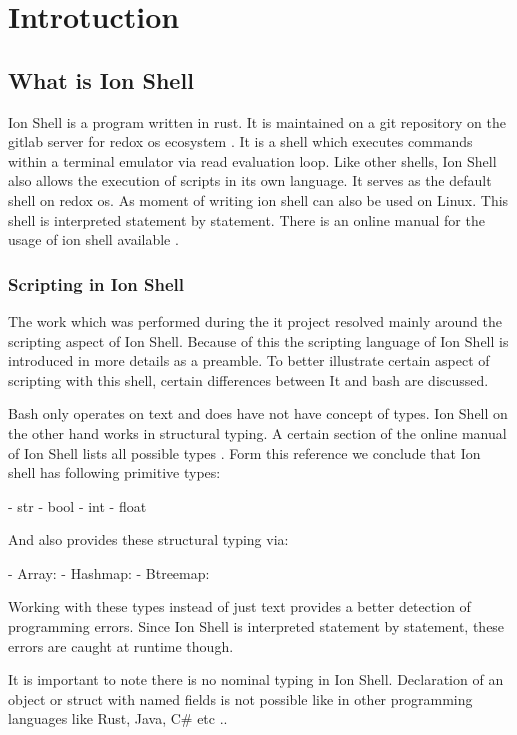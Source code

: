 \chapter{Introtuction}\label{ch:intro}

\section{What is Ion Shell}

Ion Shell is a program written in rust.
It is maintained on a git repository on the gitlab server for redox os ecosystem \cite{ion_shell}.
It is a shell which executes commands within a terminal emulator via read evaluation loop.
Like other shells, Ion Shell also allows the execution of scripts in its own language.
It serves as the default shell on redox os.
As moment of writing ion shell can also be used on Linux.
This shell is interpreted statement by statement.
There is an online manual for the usage of ion shell available \cite{ion_shell_online_manual}.

\subsection{Scripting in Ion Shell}

The work which was performed during the it project resolved mainly around the scripting aspect of Ion Shell.
Because of this the scripting language of Ion Shell is introduced in more details as a preamble.
To better illustrate certain aspect of scripting with this shell, certain differences between It and bash are discussed.

Bash only operates on text and does have not have concept of types.
Ion Shell on the other hand works in structural typing.
A certain section of the online manual of Ion Shell lists all possible types \cite{ion_shell_types}.
Form this reference we conclude that Ion shell has following primitive types:

- str
- bool
- int
- float

And also provides these structural typing via:

- Array:
- Hashmap:
- Btreemap:

Working with these types instead of just text provides a better detection of programming errors.
Since Ion Shell is interpreted statement by statement, these errors are caught at runtime though.

It is important to note there is no nominal typing in Ion Shell.
Declaration of an object or struct with named fields is not possible like in other programming languages like Rust, Java, C\# etc ..


